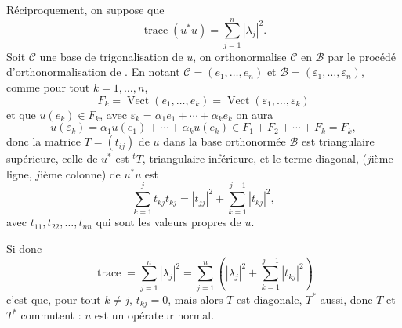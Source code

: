 \begin{enumerate}[label=\arabic*.,leftmargin=2.2em,itemsep=1.15em]
Réciproquement, on suppose que
\[
\operatorname{trace}(u^*u)=\sum_{j=1}^n|\lambda_j|^2.
\]
Soit $\mathcal C$ une base de trigonalisation de $u$, on orthonormalise $\mathcal C$ en $\mathcal B$ par le procédé d'orthonormalisation de . En notant $\mathcal C=(e_1,\ldots,e_n)$ et $\mathcal B=(\varepsilon_1,\ldots,\varepsilon_n)$, comme pour tout $k=1,\ldots,n$,
\[
F_k=\operatorname{Vect}(e_1,\ldots,e_k)=\operatorname{Vect}(\varepsilon_1,\ldots,\varepsilon_k)
\]
et que $u(e_k)\in F_k$, avec $\varepsilon_k=\alpha_1e_1+\cdots+\alpha_ke_k$ on aura
\[
u(\varepsilon_k)=\alpha_1u(e_1)+\cdots+\alpha_ku(e_k)\in F_1+F_2+\cdots+F_k=F_k,
\]
donc la matrice $T=(t_{ij})$ de $u$ dans la base orthonormée $\mathcal B$ est triangulaire supérieure, celle de $u^*$ est ${}^t\!\overline T$, triangulaire inférieure, et le terme diagonal, ($j$ième ligne, $j$ième colonne) de $u^*u$ est
\[
\sum_{k=1}^j\overline{t_{kj}}t_{kj}
=|t_{jj}|^2+\sum_{k=1}^{j-1}|t_{kj}|^2,
\]
avec $t_{11},t_{22},\ldots,t_{nn}$ qui sont les valeurs propres de $u$.

Si donc
\[
\operatorname{trace}=\sum_{j=1}^n|\lambda_j|^2
=\sum_{j=1}^n\left(|\lambda_j|^2+\sum_{k=1}^{j-1}|t_{kj}|^2\right)
\]
c'est que, pour tout $k\ne j$, $t_{kj}=0$, mais alors $T$ est diagonale, $T^*$ aussi, donc $T$ et $T^*$ commutent : $u$ est un opérateur normal.

\end{enumerate}
